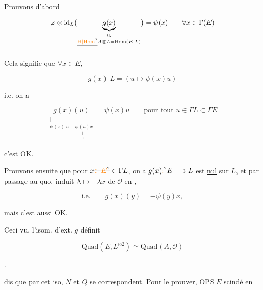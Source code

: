 


Prouvons d'abord

\[
\varphi\otimes\mathrm{id}_{L}\bigl(\underbrace{g(x)}_{\substack{\rotatebox{90}{$\in$}\\ \deleted{\unsure{\mathrm{H}|\mathrm{Hom}}}A\otimes L=\mathrm{Hom}(E,L)}}\bigr)=\psi(x)
\qquad \forall x\in\Gamma(E)
\]

Cela signifie que $\forall x\in E$,

\[
g(x)|L=(u\longmapsto\psi(x)u)
\]

 i.e. on a

\[
\underset{\substack{\Vert\\ \psi(x).u-\underset{\substack{\Vert\\0}}{\psi(u)}x}}{g(x)(u)}
=\psi(x)u\qquad\text{pour tout }u\in\Gamma L\subset\Gamma E
\]

c'est OK.

Prouvons ensuite que pour $x\deleted{\unsure{\in E}}\in\Gamma L$, on a $g(x)\unsure{:}E\longrightarrow L$ est \uline{nul} sur $L$, et par passage au quo. induit $\lambda\longmapsto-\lambda x$ de $\mathcal O$ en ,


\[
\text{i.e.}\qquad g(x)(y)=-\psi(y)x,
\]

mais c'est aussi OK.

Ceci vu, l'isom. d'ext. $g$ définit

\[
\mathrm{Quad}(E,L^{\otimes2})\simeq\mathrm{Quad}(A,\mathcal O)
\]

.

\uline{dis que  par cet} iso, \uline{$N$ et} \uline{$Q$ se} \uline{correspondent}. Pour le prouver, OPS $E$ scindé en

